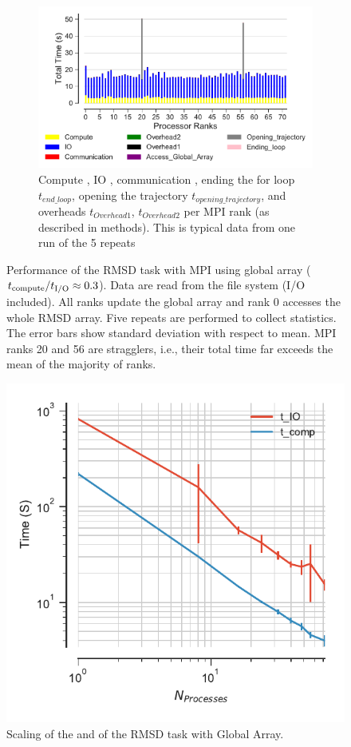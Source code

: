\begin{figure}[ht!]
\begin{subfigure} {.8\textwidth}
  \includegraphics[width=\linewidth]{figures/RMSD-ga4py-BarPlot-rank-comparison_72_1.pdf}
  \caption{Compute \tcomp, IO \tIO, communication \tcomm , ending the for loop $t_{end\_loop}$,
  opening the trajectory $t_{opening\_trajectory}$, and overheads $t_{Overhead1}$,  $t_{Overhead2}$ per MPI rank (as described in methods).
  This is typical data from one run of the 5 repeats}
  \label{fig:MPIranks-ga4py}
\end{subfigure}
%
\caption{Performance of the RMSD task with MPI using global array (${t}_{\text{compute}}/{t}_{\text{I/O}} \approx 0.3$).
Data are read from the file system (I/O included). All ranks update the global array and rank 0 accesses the whole RMSD array.
Five repeats are performed to collect statistics. The error bars show standard deviation with respect to mean. 
MPI ranks 20 and 56 are stragglers, i.e., their total time far exceeds the mean of the majority of ranks.}
\label{fig:MPIwithIO-ga4py}
\end{figure}

\begin{figure}[ht!]
\centering
  \includegraphics[width=0.4\linewidth]{figures/RMSD-ga4py-time_IO_comparison.pdf}
\caption{Scaling of the \tcomp and \tIO of the RMSD task with Global Array.}
\label{fig:ScalingComputeIO-ga4py}
\end{figure}

